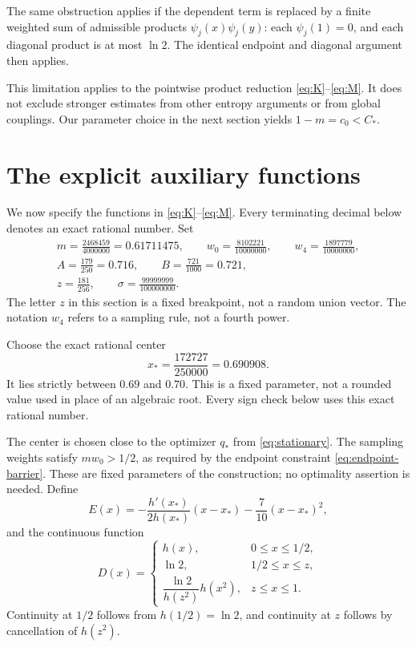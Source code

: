 \documentclass[11pt]{article}
\theoremstyle{remark}
\begin{document}
The same obstruction applies if the dependent term is replaced by a
finite weighted sum of admissible products
\(\psi_j(x)\psi_j(y)\): each \(\psi_j(1)=0\), and each diagonal
product is at most \(\ln2\). The identical endpoint and diagonal
argument then applies.


This limitation applies to the pointwise product reduction
\eqref{eq:K}--\eqref{eq:M}. It does not exclude stronger estimates from
other entropy arguments or from global couplings. Our parameter choice
in the next section yields \(1-m=c_0<C_*\).

\section{The explicit auxiliary functions}\label{sec:profile}

We now specify the functions in \eqref{eq:K}--\eqref{eq:M}.
Every terminating decimal below denotes an exact rational number.
Set
\begin{equation}\label{eq:parameters}
\begin{gathered}
m=\frac{2468459}{4000000}=0.61711475,\qquad
w_0=\frac{8102221}{10000000},\qquad w_4=\frac{1897779}{10000000},\\
A=\frac{179}{250}=0.716,\qquad B=\frac{721}{1000}=0.721,\\
z=\frac{181}{256},\qquad \sigma=\frac{99999999}{100000000}.
\end{gathered}
\end{equation}
The letter \(z\) in this section is a fixed breakpoint, not a random
union vector. The notation \(w_4\) refers to a sampling rule, not a
fourth power.

Choose the exact rational center
\[
x_*=\frac{172727}{250000}=0.690908.
\]
It lies strictly between \(0.69\) and \(0.70\).
This is a fixed parameter, not a rounded value used in place of an
algebraic root. Every sign check below uses this exact rational number.

The center is chosen close to the optimizer \(q_*\) from
\eqref{eq:stationary}. The sampling weights satisfy \(mw_0>1/2\),
as required by the endpoint constraint
\eqref{eq:endpoint-barrier}. These are fixed parameters of the
construction; no optimality assertion is needed.
Define
\begin{equation}\label{eq:E}
E(x)=-\frac{h'(x_*)}{2h(x_*)}(x-x_*)-\frac7{10}(x-x_*)^2,
\end{equation}
and the continuous function
\begin{equation}\label{eq:D}
D(x)=
\begin{cases}
h(x),&0\le x\le1/2,\\
\ln2,&1/2\le x\le z,\\
\dfrac{\ln2}{h(z^2)}h(x^2),&z\le x\le1.
\end{cases}
\end{equation}
Continuity at \(1/2\) follows from \(h(1/2)=\ln2\), and continuity
at \(z\) follows by cancellation of \(h(z^2)\).
\end{document}
